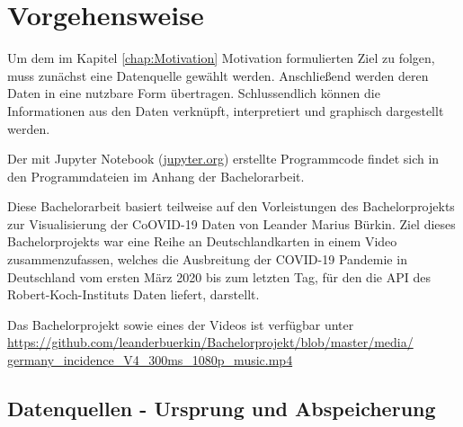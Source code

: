 \chapter{Vorgehensweise}\label{chap:Vorgehensweise}
Um dem im Kapitel \glqq{}\ref{chap:Motivation} Motivation\grqq{} formulierten Ziel zu folgen, muss zunächst eine Datenquelle gewählt werden.
Anschließend werden deren Daten in eine nutzbare Form übertragen.
Schlussendlich können die Informationen aus den Daten verknüpft, interpretiert und graphisch dargestellt werden.

Der mit Jupyter Notebook (\href{jupyter.org}{jupyter.org}) erstellte Programmcode findet sich in den Programmdateien im Anhang der Bachelorarbeit.

Diese Bachelorarbeit basiert teilweise auf den Vorleistungen des Bachelorprojekts zur Visualisierung der CoOVID-19 Daten von Leander Marius Bürkin.
Ziel dieses Bachelorprojekts war eine Reihe an Deutschlandkarten in einem Video zusammenzufassen, welches die Ausbreitung der COVID-19 Pandemie in Deutschland vom ersten März 2020 bis zum letzten Tag, für den die API des Robert-Koch-Instituts Daten liefert, darstellt.


Das Bachelorprojekt sowie eines der Videos ist verfügbar unter\\
\href{https://github.com/leanderbuerkin/Bachelorprojekt/blob/master/media/germany_incidence_V4_300ms_1080p_music.mp4}{https://github.com/leanderbuerkin/Bachelorprojekt/blob/master/media/}\\
\href{https://github.com/leanderbuerkin/Bachelorprojekt/blob/master/media/germany_incidence_V4_300ms_1080p_music.mp4}{germany\_incidence\_V4\_300ms\_1080p\_music.mp4}

\section{Datenquellen - Ursprung und Abspeicherung}\label{sec:Datenquelle}

